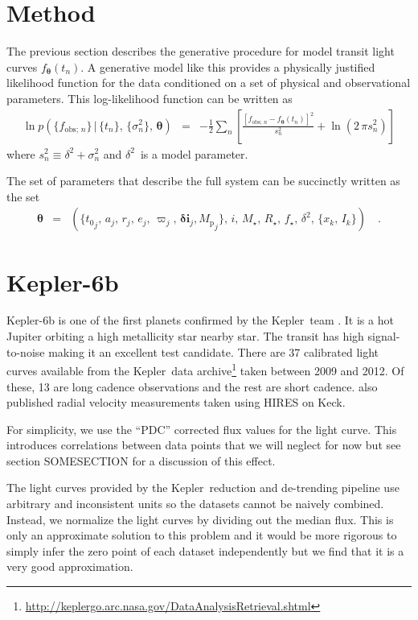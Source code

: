 \documentclass[12pt,preprint]{aastex}
\newcommand{\project}[1]{{\sffamily #1}}
\newcommand{\kepler}{\project{Kepler}}
\newcommand{\bvec}[1]{\ensuremath{\boldsymbol{#1}}}
\newcommand{\pr}[1]{\ensuremath{p (#1)}}
\newcommand{\setof}[1]{\ensuremath{\{ #1 \}}}
\newcommand{\model}{\ensuremath{\bvec{\theta}}}
\newcommand{\tobs}{\ensuremath{t_n}}
\newcommand{\fmodel}{\ensuremath{f_{\model} (\tobs)}}
\newcommand{\fobs}{\ensuremath{f_{\mathrm{obs};\,n}}}
\newcommand{\ferr}{\ensuremath{\sigma_n^2}}
\newcommand{\fullerr}{\ensuremath{s_n^2}}
\newcommand{\rstar}{\ensuremath{R_\star}}
\newcommand{\rplanet}{\ensuremath{r}}
\newcommand{\rsurface}{\ensuremath{x}}
\newcommand{\tzero}{\ensuremath{{t_0}}}
\newcommand{\smaxis}{\ensuremath{a}}
\newcommand{\ecc}{\ensuremath{e}}
\newcommand{\pomega}{\ensuremath{\varpi}}
\newcommand{\incl}{\ensuremath{\bvec{\delta i}}}
\newcommand{\mplanet}{\ensuremath{{M_\mathrm{p}}}}
\newcommand{\jitter}{\ensuremath{\delta^2}}
\newcommand{\mstar}{\ensuremath{M_\star}}
\newcommand{\fstar}{\ensuremath{f_\star}}
\newcommand{\iobs}{\ensuremath{i}}
\begin{document}
\section{Method}

The previous section describes the generative procedure for model transit
light curves \fmodel.
A generative model like this provides a physically justified likelihood
function for the data conditioned on a set of physical and observational
parameters.
This log-likelihood function can be written as
\begin{eqnarray}
    \ln \pr{\setof{\fobs}\,|\,\setof{\tobs},\,\setof{\ferr},\,\model}
    & = & -\frac{1}{2} \sum_{n} \left [ \frac{[\fobs - \fmodel]^2}{\fullerr}
+ \ln \left ( 2\,\pi\fullerr \right ) \right ]
\end{eqnarray}
where $\fullerr \equiv \jitter + \ferr$ and \jitter\ is a model parameter.

The set of parameters that describe the full system can be succinctly written
as the set
\begin{eqnarray}
    \model & = & \left (
        \setof{\tzero_j,\,\smaxis_j,\,\rplanet_j,\,\ecc_j,\,\pomega_j,\,
        \incl_j, \mplanet_j},\,\iobs,\,\mstar,\,\rstar,\,\fstar,\,\jitter,\,
        \setof{\rsurface_k,\,I_k}
    \right ) \quad.
\end{eqnarray}


\section{Kepler-6b}

Kepler-6b is one of the first planets confirmed by the \kepler\ team
\citep{kepler6b}.
It is a hot Jupiter orbiting a high metallicity star nearby star.
The transit has high signal-to-noise making it an excellent test candidate.
There are 37 calibrated light curves available from the \kepler\ data
archive\footnote{%
\url{http://keplergo.arc.nasa.gov/DataAnalysisRetrieval.shtml}} taken between
2009 and 2012.
Of these, 13 are long cadence observations and the rest are short cadence.
\citet{kepler6b} also published radial velocity measurements taken using HIRES
on Keck.

For simplicity, we use the ``PDC'' corrected flux values for the light curve.
This introduces correlations between data points that we will neglect for now
but see section SOMESECTION for a discussion of this effect.

The light curves provided by the \kepler\ reduction and de-trending pipeline
use arbitrary and inconsistent units so the datasets cannot be naively
combined.
Instead, we normalize the light curves by dividing out the median flux.
This is only an approximate solution to this problem and it would be more
rigorous to simply infer the zero point of each dataset independently but we
find that it is a very good approximation.
\end{document}
